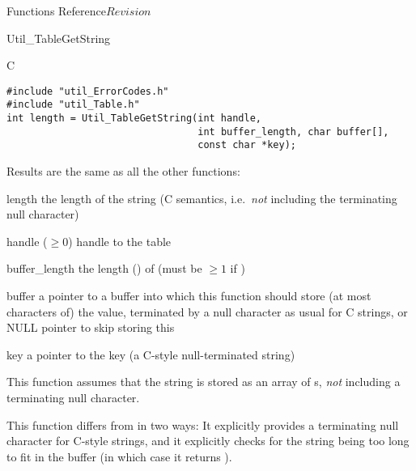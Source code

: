 \begin{cactuspart}{ Functions Reference}{}{$Revision$}
\begin{FunctionDescription}{Util\_TableGetString}
\begin{SynopsisSection}
\begin{Synopsis}{C}
\begin{verbatim}
#include "util_ErrorCodes.h"
#include "util_Table.h"
int length = Util_TableGetString(int handle,
                                 int buffer_length, char buffer[],
                                 const char *key);
\end{verbatim}
\end{Synopsis}
\end{SynopsisSection}

\begin{ResultSection}
\begin{ResultNote}
Results are the same as all the other  functions:
\end{ResultNote}
\begin{Result}{length}
the length of the string
(C  semantics, i.e.\ {\em not\/} including
the terminating null character)
\end{Result}
\end{ResultSection}

\begin{ParameterSection}
\begin{Parameter}{handle ($\ge 0$)}
handle to the table
\end{Parameter}
\begin{Parameter}{buffer\_length}
the length () of 
(must be $\ge 1$ if )
\end{Parameter}
\begin{Parameter}{buffer}
a pointer to a buffer into which this function should store
(at most   characters of) the value,
terminated by a null character as usual for C strings,
or NULL pointer to skip storing this
\end{Parameter}
\begin{Parameter}{key}
a pointer to the key (a C-style null-terminated string)
\end{Parameter}
\end{ParameterSection}

\begin{Discussion}
This function assumes that the string is stored as an array of
s, {\em not\/} including a terminating null character.

This function differs from  in two ways:
It explicitly provides a terminating null character for C-style strings,
and it explicitly checks for the string being too long to fit in the buffer
(in which case it returns ).


\end{Discussion}
\end{FunctionDescription}
\end{cactuspart}
